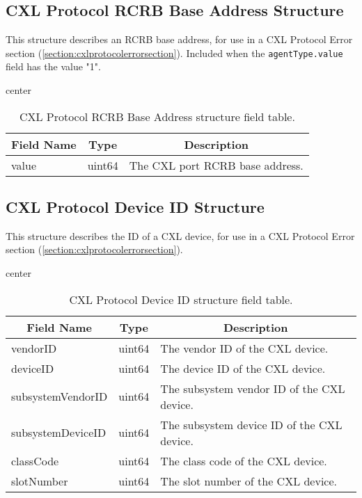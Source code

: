 \documentclass{report}
\newcommand*{\thead}[1]{\multicolumn{1}{|c|}{\bfseries #1}}
\newcommand*{\jsontable}[1]{
    \begin{table}[!ht]
    \label{#1}
    \centering
    \begin{adjustbox}{center}
    \begin{tabular}{|l|c|p{8cm}|}
    \hline
    \thead{Field Name} & \thead{Type} & \thead{Description} \\
    \hline
}
\newcommand*{\jsontableend}[1]{
    \hline
    \end{tabular}
    \end{adjustbox}
    \caption{#1}
    \label{table:#1}
    \end{table}
    \FloatBarrier
}
\begin{document}
\subsection{CXL Protocol RCRB Base Address Structure}
\label{subsection:cxlprotocolrcrbaddressstructure}
This structure describes an RCRB base address, for use in a CXL Protocol Error section (\ref{section:cxlprotocolerrorsection}). Included when the \texttt{agentType.value} field has the value "1".
\jsontable{table:cxlprotocolrcrbaddressstructure}
value & uint64 & The CXL port RCRB base address.\\
\jsontableend{CXL Protocol RCRB Base Address structure field table.}

\subsection{CXL Protocol Device ID Structure}
\label{subsection:cxlprotocoldeviceidstructure}
This structure describes the ID of a CXL device, for use in a CXL Protocol Error section (\ref{section:cxlprotocolerrorsection}).
\jsontable{table:cxlprotocoldeviceidstructure}
vendorID & uint64 & The vendor ID of the CXL device.\\
\hline
deviceID & uint64 & The device ID of the CXL device.\\
\hline
subsystemVendorID & uint64 & The subsystem vendor ID of the CXL device.\\
\hline
subsystemDeviceID & uint64 & The subsystem device ID of the CXL device.\\
\hline
classCode & uint64 & The class code of the CXL device.\\
\hline
slotNumber & uint64 & The slot number of the CXL device.\\
\jsontableend{CXL Protocol Device ID structure field table.}

\end{document}
